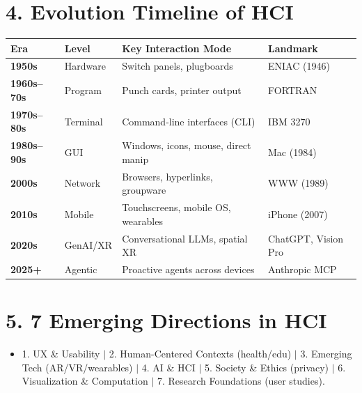 \documentclass[8.5pt,a4paper,twocolumn]{article}
\begin{document}
\section*{4. Evolution Timeline of HCI}
{\scriptsize
\begin{tabularx}{\linewidth}{@{}llXl@{}}
\toprule
\textbf{Era} & \textbf{Level} & \textbf{Key Interaction Mode} & \textbf{Landmark} \\
\midrule
\textbf{1950s} & Hardware & Switch panels, plugboards & ENIAC (1946) \\
\textbf{1960s--70s} & Program & Punch cards, printer output & FORTRAN \\
\textbf{1970s--80s} & Terminal & Command-line interfaces (CLI) & IBM 3270 \\
\textbf{1980s--90s} & GUI & Windows, icons, mouse, direct manip & Mac (1984) \\
\textbf{2000s} & Network & Browsers, hyperlinks, groupware & WWW (1989) \\
\textbf{2010s} & Mobile & Touchscreens, mobile OS, wearables & iPhone (2007) \\
\textbf{2020s} & GenAI/XR & Conversational LLMs, spatial XR & ChatGPT, Vision Pro \\
\textbf{2025+} & Agentic & Proactive agents across devices & Anthropic MCP \\
\bottomrule
\end{tabularx}
}

\section*{5. 7 Emerging Directions in HCI}
\begin{itemize}[leftmargin=7pt, itemsep=0.5pt, topsep=0.5pt]
    \item \scriptsize 1. UX \& Usability $\vert$ 2. Human-Centered Contexts (health/edu) $\vert$ 3. Emerging Tech (AR/VR/wearables) $\vert$ 4. AI \& HCI $\vert$ 5. Society \& Ethics (privacy) $\vert$ 6. Visualization \& Computation $\vert$ 7. Research Foundations (user studies).
\end{itemize}

\newpage
\end{document}
